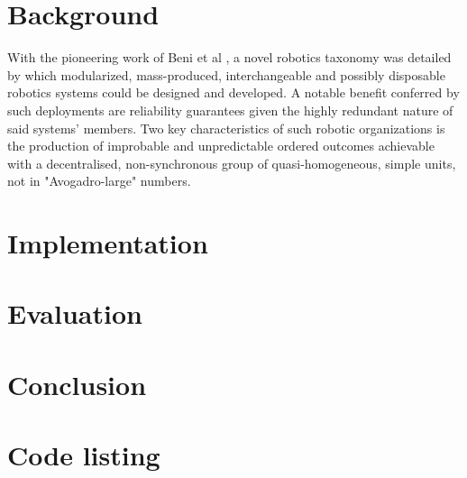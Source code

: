 \documentclass{report}
\begin{document}
\chapter{Background}
With the pioneering work of Beni et al \cite{Beni2005a}, a novel robotics taxonomy was detailed by which modularized, mass-produced, interchangeable and possibly disposable robotics systems could be designed and developed. A notable benefit conferred by such deployments are reliability guarantees given the highly redundant nature of said systems' members. Two key characteristics of such robotic organizations is the production of improbable and unpredictable ordered outcomes achievable with a decentralised, non-synchronous group of quasi-homogeneous, simple units, not in "Avogadro-large" numbers.
\chapter{Implementation}
\chapter{Evaluation}
\chapter{Conclusion}

\appendix


\chapter{Code listing}
\end{document}
